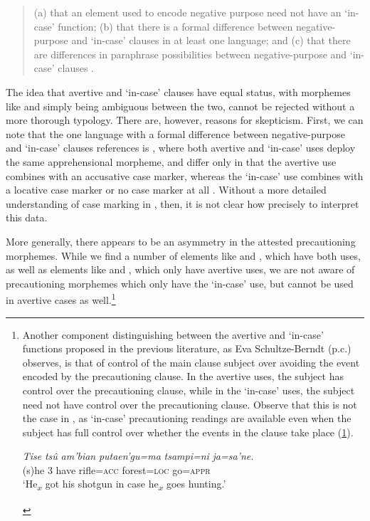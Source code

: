 \documentclass[output=paper,colorlinks,citecolor=brown]{langscibook}
\begin{document}
\begin{quote}
(a) that an element used to encode negative purpose need not have an `in-case' function; (b) that there is a formal difference between negative-purpose and `in-case' clauses in at least one language; and (c) that there are differences in paraphrase possibilities between negative-pur\-pose and `in-case' clauses \citep[302]{lichtenberk1995apprehensional}.
\end{quote}

The idea that avertive and `in-case' clauses have equal status, with morphemes like   and   simply being ambiguous between the two, cannot be rejected without a more thorough typology. There are, however, reasons for skepticism. First, we can note that the one language with a formal difference between negative-purpose and `in-case' clauses \citet{lichtenberk1995apprehensional} references is , where both avertive and `in-case' uses deploy the same apprehensional morpheme,  and differ only in that the avertive use combines with an accusative  case marker, whereas the `in-case' use combines with a locative  case marker or no case marker at all \citep{dench1988complex}. Without a more detailed understanding of case marking in , then, it is not clear how precisely to interpret this data.

More generally, there appears to be an asymmetry in the attested precautioning morphemes. While we find a number of elements like  \pagebreak and  , which have both uses, as well as elements like   and  , which only have avertive uses, we are not aware of precautioning morphemes which only have the `in-case' use, but cannot be used in avertive cases as well.\footnote{{Another component distinguishing between the avertive and `in-case' functions proposed in the previous literature, as Eva Schultze-Berndt (p.c.) observes, is that of control of the main clause subject over avoiding the event encoded by the precautioning clause. In the avertive uses, the subject has control over the precautioning clause, while in the `in-case' uses, the subject need not have control over the precautioning clause. Observe that this is not the case in , as `in-case' precautioning readings are available even when the subject has full control over whether the events in the  clause take place (\ref{gotoforest}).}
\begin{exe}
    \ex \label{gotoforest}
    \gll \textit{Tise} \textit{tsû} \textit{am'bian} \textit{putaen'gu=ma} {\ob}\textit{tsampi=ni} \textit{ja=sa'ne.}{\cb} \\
    (s)he \textsc{3} have rifle=\textsc{acc} forest=\textsc{loc} go=\textsc{appr} \\
    \glt `He\textsubscript{$x$} got his shotgun in case he\textsubscript{$x$} goes hunting.'
\end{exe}}
\end{document}
